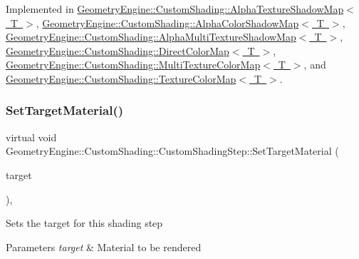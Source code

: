 Implemented in \mbox{\hyperlink{class_geometry_engine_1_1_custom_shading_1_1_alpha_texture_shadow_map_a32014c932093151182926d6d681314de}{Geometry\+Engine\+::\+Custom\+Shading\+::\+Alpha\+Texture\+Shadow\+Map$<$ T $>$}}, \mbox{\hyperlink{class_geometry_engine_1_1_custom_shading_1_1_alpha_color_shadow_map_a8e1174fd5d5ee8e5a86940b22235f8ec}{Geometry\+Engine\+::\+Custom\+Shading\+::\+Alpha\+Color\+Shadow\+Map$<$ T $>$}}, \mbox{\hyperlink{class_geometry_engine_1_1_custom_shading_1_1_alpha_multi_texture_shadow_map_ae4bed1f5f5d0200e614d62f42d58048c}{Geometry\+Engine\+::\+Custom\+Shading\+::\+Alpha\+Multi\+Texture\+Shadow\+Map$<$ T $>$}}, \mbox{\hyperlink{class_geometry_engine_1_1_custom_shading_1_1_direct_color_map_a1225b6be095646d969d8bde5f8eaac73}{Geometry\+Engine\+::\+Custom\+Shading\+::\+Direct\+Color\+Map$<$ T $>$}}, \mbox{\hyperlink{class_geometry_engine_1_1_custom_shading_1_1_multi_texture_color_map_a5cee1ebee9e647db140bc4a5d0dfdaa6}{Geometry\+Engine\+::\+Custom\+Shading\+::\+Multi\+Texture\+Color\+Map$<$ T $>$}}, and \mbox{\hyperlink{class_geometry_engine_1_1_custom_shading_1_1_texture_color_map_ab24f03e6d8dabac3889315c5e583a60d}{Geometry\+Engine\+::\+Custom\+Shading\+::\+Texture\+Color\+Map$<$ T $>$}}.

\mbox{\label{class_geometry_engine_1_1_custom_shading_1_1_custom_shading_step_a7113c454f34a3870df11420749f21d11}} 
\subsubsection{\texorpdfstring{SetTargetMaterial()}{SetTargetMaterial()}}
{\footnotesize\ttfamily virtual void Geometry\+Engine\+::\+Custom\+Shading\+::\+Custom\+Shading\+Step\+::\+Set\+Target\+Material (\begin{DoxyParamCaption}\item[{\mbox{\hyperlink{class_geometry_engine_1_1_geometry_material_1_1_material}{Geometry\+Material\+::\+Material}} $\ast$}]{target }\end{DoxyParamCaption})\hspace{0.3cm}{\ttfamily [inline]}, {\ttfamily [virtual]}}

Sets the target for this shading step 
\begin{DoxyParams}{Parameters}
{\em target} & Material to be rendered \\
\hline
\end{DoxyParams}


